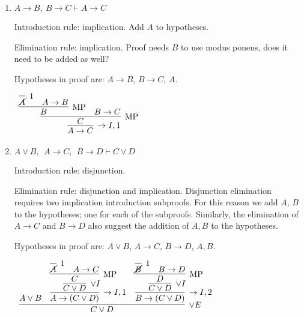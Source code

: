 \documentclass[11pt]{report}
\begin{document}
\begin{enumerate}
\begin{enumerate}
		\newpage
		\item $A \to B, \ B \to C \vdash A \to C $
				
		\hspace{0.2cm}{\bf Solution}

		Introduction rule: implication. Add $A$ to hypotheses.
			
		\vspace{0.2cm}
			
		Elimination rule: implication. Proof needs $B$ to use modus ponens, does it need to be added as well?
		
		\vspace{0.2cm}

		Hypotheses in proof are: $A \to B$, $B \to C$, $A$.  
		
		\begin{mdframed}	
			\begin{center}
				$\begin{array}{c}
					\infer[\to I,1]{A \to C}
						{\infer[\MP]{C}
							{\infer[\MP]{B}
								{\infer[1]{\cancel{A}}{} & A \to B}
							&
							B \to C}}
				\end{array}$
			\end{center}
		\end{mdframed}		
		
		\item $A \lor B,\ \ A \to C,\ \ B \to D \vdash  C \lor D$
				
		\hspace{0.2cm}{\bf Solution}

		Introduction rule: disjunction. 
			
		\vspace{0.2cm}
			
		Elimination rule: disjunction and implication. Disjunction elimination requires two implication introduction subproofs. For this reason we add $A$, $B$ to the hypotheses; one for each of the subproofs. Similarly, the elimination of $A\to C$ and $B \to D$ also suggest the addition of $A,B$ to the hypotheses. 
		
		\vspace{0.2cm}

		Hypotheses in proof are: $A \lor B$, $A \to C$, $B \to D$, $A,B$. 

		\begin{mdframed}
			\begin{center}
				$\begin{array}{c}
					\infer[\lor E]{C \lor D}
						{A \lor B
						&
						\infer[\to I,1]{A \to (C \lor D)}
							{\infer[\lor I]{C \lor D}
								{\infer[\MP]{C}
									{\infer[1]{\cancel{A}}{}
									&
									A \to C}}}
						&
						\infer[\to I,2]{B \to (C \lor D)}
						{\infer[\lor I]{C \lor D}
							{\infer[\MP]{D}
								{\infer[1]{\cancel{B}}{}
								&
								B \to D}}}					 
						}				
				\end{array}$
			\end{center}
		\end{mdframed}
		

\end{enumerate}
\end{enumerate}
\end{document}
